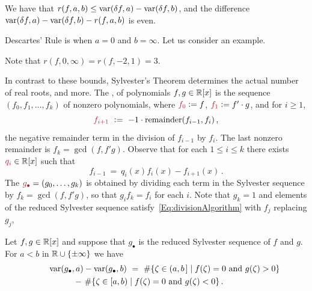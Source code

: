 \begin{theorem}
  We have that $r(f,a,b)\leq \operatorname{{\rm var}}(\delta f,a) -\operatorname{{\rm var}}(\delta f,b)$, and the difference
  $\operatorname{{\rm var}}(\delta f,a) -\operatorname{{\rm var}}(\delta f,b)-r(f,a,b)$ is even. 
\end{theorem}

Descartes' Rule is when $a=0$ and $b=\infty$.
Let us consider an example.
%
\begin{leftbar}

\end{leftbar}
%
Note that $r(f,0,\infty)=r(f,-2,1)=3$.

In contrast to these bounds, 
Sylvester's Theorem determines the actual number of real roots, and more.
The ,  of polynomials $f,g\in\mathbb{R}[x]$ is the sequence
$\left(f_0,f_1,\dotsc,f_k\right)$ of nonzero polynomials, where $\defcolor{f_0}\vcentcolon= f$, $\defcolor{f_1}\vcentcolon= f'\cdot g$,
and for $i\geq 1$, 
%
  \[
    \defcolor{f_{i+1}}\ \vcentcolon=\ -1\cdot \mbox{remainder}(f_{i-1},f_i)\,,
  \]
%
the negative remainder term in the division of $f_{i-1}$ by $f_i$.
The last nonzero remainder is $f_k = \gcd(f,f'g)$.
Observe that for each $1\leq i\leq k$ there exists $\defcolor{q_i}\in\RR[x]$ such that
%
 \begin{equation}\label{Eq:divisionAlgorithm}
    f_{i-1}\ =\ q_i(x)f_i(x)-f_{i+1}(x)\,.
 \end{equation}
%
The  $\defcolor{g_\bullet}=(g_0,\dotsc,g_k)$ is obtained by dividing each term in the Sylvester sequence
by $f_k=\gcd(f,f'g)$, so that $g_if_k=f_i$ for each $i$. 
Note that  $g_k=1$ and elements of the reduced Sylvester sequence satisfy~\eqref{Eq:divisionAlgorithm} with $f_j$ replacing $g_j$,


\begin{theorem}[Sylvester]
  \label{Th:Sylvester}
  Let $f,g\in\mathbb{R}[x]$ and suppose that $g_\bullet$ is the reduced Sylvester sequence of $f$ and $g$.
  For $a<b$ in $\mathbb{R}\cup\{\pm\infty\}$ we have
  \begin{multline*}
    \qquad\operatorname{{\rm var}}(g_\bullet,a)-\operatorname{{\rm var}}(g_\bullet,b)\ =\
    \#\{\zeta\in(a,b\hspace{.05cm}]\mid f(\zeta)=0\mbox{ and } g(\zeta)>0\}\\
      \ -\
    \#\{\zeta\in[a,b)\mid f(\zeta)=0\mbox{ and } g(\zeta)<0\}\,.\qquad
  \end{multline*}
\end{theorem}

